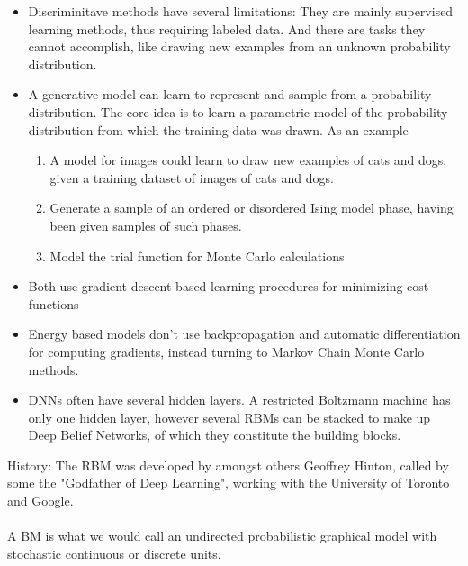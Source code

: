 \documentclass[%
oneside,                 %
final,                   %
10pt]{article}
\begin{document}
\begin{itemize}
\item Discriminitave methods have several limitations: They are mainly supervised learning methods, thus requiring labeled data. And there are tasks they cannot accomplish, like drawing new examples from an unknown probability distribution.

\item A generative model can learn to represent and sample from a probability distribution. The core idea is to learn a parametric model of the probability distribution from which the training data was drawn. As an example
\begin{enumerate}

 \item A model for images could learn to draw new examples of cats and dogs, given a training dataset of images of cats and dogs.

 \item Generate a sample of an ordered or disordered Ising model phase, having been given samples of such phases.

 \item Model the trial function for Monte Carlo calculations

\end{enumerate}

\noindent
\item Both use gradient-descent based learning procedures for minimizing cost functions

\item Energy based models don't use backpropagation and automatic differentiation for computing gradients, instead turning to Markov Chain Monte Carlo methods.

\item DNNs often have several hidden layers. A restricted Boltzmann machine has only one hidden layer, however several RBMs can be stacked to make up Deep Belief Networks, of which they constitute the building blocks.
\end{itemize}

\noindent
History: The RBM was developed by amongst others Geoffrey Hinton, called by some the "Godfather of Deep Learning", working with the University of Toronto and Google.




\paragraph{}
A BM is what we would call an undirected probabilistic graphical model
with stochastic continuous or discrete units.
\end{document}

